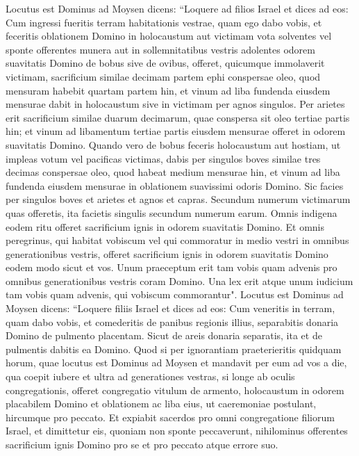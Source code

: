 \begin{biblechapter}  
\verse Locutus est Dominus ad Moysen dicens: 
\verse “Loquere ad filios Israel et dices ad eos: Cum ingressi fueritis terram habitationis vestrae, quam ego dabo vobis, 
\verse et feceritis oblationem Domino in holocaustum aut victimam vota solventes vel sponte offerentes munera aut in sollemnitatibus vestris adolentes odorem suavitatis Domino de bobus sive de ovibus, 
\verse offeret, quicumque immolaverit victimam, sacrificium similae decimam partem ephi conspersae oleo, quod mensuram habebit quartam partem hin, 
\verse et vinum ad liba fundenda eiusdem mensurae dabit in holocaustum sive in victimam per agnos singulos. 
\verse Per arietes erit sacrificium similae duarum decimarum, quae conspersa sit oleo tertiae partis hin; 
\verse et vinum ad libamentum tertiae partis eiusdem mensurae offeret in odorem suavitatis Domino. 
\verse Quando vero de bobus feceris holocaustum aut hostiam, ut impleas votum vel pacificas victimas, 
\verse dabis per singulos boves similae tres decimas conspersae oleo, quod habeat medium mensurae hin, 
\verse et vinum ad liba fundenda eiusdem mensurae in oblationem suavissimi odoris Domino. 
\verse Sic facies per singulos boves et arietes et agnos et capras. 
\verse Secundum numerum victimarum quas offeretis, ita facietis singulis secundum numerum earum. 
\verse Omnis indigena eodem ritu offeret sacrificium ignis in odorem suavitatis Domino. 
\verse Et omnis peregrinus, qui habitat vobiscum vel qui commoratur in medio vestri in omnibus generationibus vestris, offeret sacrificium ignis in odorem suavitatis Domino eodem modo sicut et vos. 
\verse Unum praeceptum erit tam vobis quam advenis pro omnibus generationibus vestris coram Domino. 
\verse Una lex erit atque unum iudicium tam vobis quam advenis, qui vobiscum commorantur". 
\verse Locutus est Dominus ad Moysen dicens: 
\verse “Loquere filiis Israel et dices ad eos: Cum veneritis in terram, quam dabo vobis, 
\verse et comederitis de panibus regionis illius, separabitis donaria Domino 
\verse de pulmento placentam. Sicut de areis donaria separatis, 
\verse ita et de pulmentis dabitis ea Domino. 
\verse Quod si per ignorantiam praeterieritis quidquam horum, quae locutus est Dominus ad Moysen 
\verse et mandavit per eum ad vos a die, qua coepit iubere et ultra ad generationes vestras, 
\verse si longe ab oculis congregationis, offeret congregatio vitulum de armento, holocaustum in odorem placabilem Domino et oblationem ac liba eius, ut caeremoniae postulant, hircumque pro peccato. 
\verse Et expiabit sacerdos pro omni congregatione filiorum Israel, et dimittetur eis, quoniam non sponte peccaverunt, nihilominus offerentes sacrificium ignis Domino pro se et pro peccato atque errore suo. 

\end{biblechapter}
